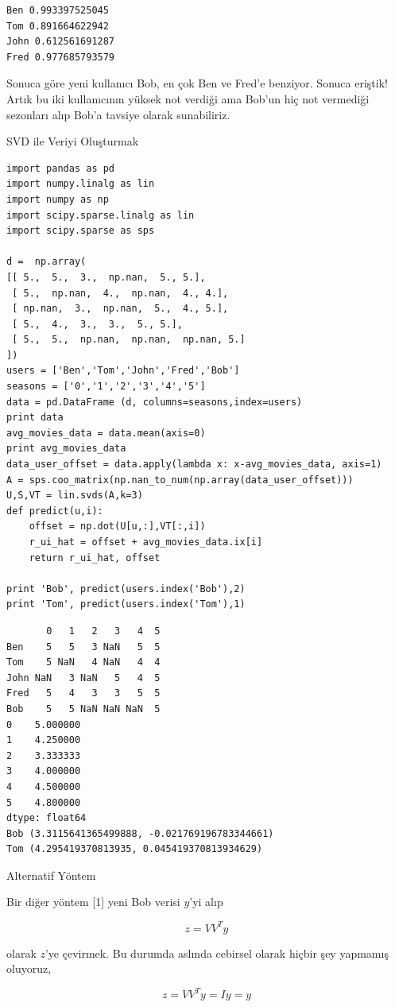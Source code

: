 \documentclass[12pt,fleqn]{article}\usepackage{../../common}
\begin{document}
\begin{verbatim}
Ben 0.993397525045
Tom 0.891664622942
John 0.612561691287
Fred 0.977685793579
\end{verbatim}

Sonuca göre yeni kullanıcı Bob, en çok Ben ve Fred'e benziyor. Sonuca
eriştik! Artık bu iki kullanıcının yüksek not verdiği ama Bob'un hiç
not vermediği sezonları alıp Bob'a tavsiye olarak sunabiliriz.

SVD ile Veriyi Oluşturmak

\begin{verbatim}
import pandas as pd
import numpy.linalg as lin
import numpy as np
import scipy.sparse.linalg as lin
import scipy.sparse as sps

d =  np.array(
[[ 5.,  5.,  3.,  np.nan,  5., 5.],
 [ 5.,  np.nan,  4.,  np.nan,  4., 4.],
 [ np.nan,  3.,  np.nan,  5.,  4., 5.],
 [ 5.,  4.,  3.,  3.,  5., 5.],
 [ 5.,  5.,  np.nan,  np.nan,  np.nan, 5.]
])
users = ['Ben','Tom','John','Fred','Bob']
seasons = ['0','1','2','3','4','5']
data = pd.DataFrame (d, columns=seasons,index=users)
print data
avg_movies_data = data.mean(axis=0)
print avg_movies_data
data_user_offset = data.apply(lambda x: x-avg_movies_data, axis=1)
A = sps.coo_matrix(np.nan_to_num(np.array(data_user_offset)))
U,S,VT = lin.svds(A,k=3)
def predict(u,i):
    offset = np.dot(U[u,:],VT[:,i]) 
    r_ui_hat = offset + avg_movies_data.ix[i] 
    return r_ui_hat, offset

print 'Bob', predict(users.index('Bob'),2)
print 'Tom', predict(users.index('Tom'),1)
\end{verbatim}

\begin{verbatim}
       0   1   2   3   4  5
Ben    5   5   3 NaN   5  5
Tom    5 NaN   4 NaN   4  4
John NaN   3 NaN   5   4  5
Fred   5   4   3   3   5  5
Bob    5   5 NaN NaN NaN  5
0    5.000000
1    4.250000
2    3.333333
3    4.000000
4    4.500000
5    4.800000
dtype: float64
Bob (3.3115641365499888, -0.021769196783344661)
Tom (4.295419370813935, 0.045419370813934629)
\end{verbatim}

Alternatif Yöntem

Bir diğer yöntem [1] yeni Bob verisi $y$'yi alıp

$$ z = VV^Ty $$

olarak $z$'ye çevirmek. Bu durumda aslında cebirsel olarak hiçbir şey
yapmamış oluyoruz,

$$ z = VV^Ty = Iy = y$$
\end{document}
